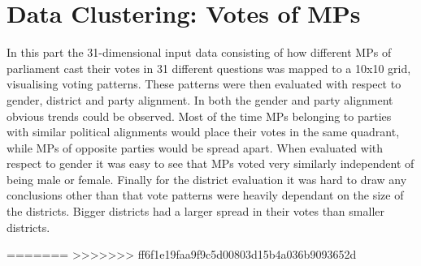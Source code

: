 \documentclass{article}
\begin{document}
\section{Data Clustering: Votes of MPs}
In this part the 31-dimensional input data consisting of how different MPs of parliament cast their votes in 31 different questions was mapped to a 10x10 grid, visualising voting patterns. These patterns were then evaluated with respect to gender, district and party alignment. In both the gender and party alignment obvious trends could be observed. Most of the time MPs belonging to parties with similar political alignments would place their votes in the same quadrant, while MPs of opposite parties would be spread apart. When evaluated with respect to gender it was easy to see that MPs voted very similarly independent of being male or female. Finally for the district evaluation it was hard to draw any conclusions other than that vote patterns were heavily dependant on the size of the districts. Bigger districts had a larger spread in their votes than smaller districts.



=======
>>>>>>> ff6f1e19faa9f9c5d00803d15b4a036b9093652d
\end{document}
